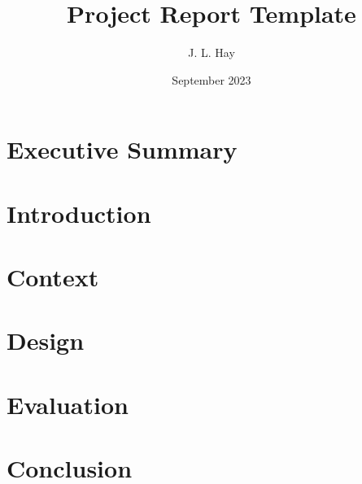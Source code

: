 \documentclass{article}
\title{Project Report Template}
\author{J. L. Hay \cite{hay22}}
\date{September 2023}
\begin{document}
\maketitle

\thispagestyle{empty}

\pagebreak



\section*{Executive Summary}


\pagebreak


\tableofcontents

\pagebreak


\fancyfoot[R]{\thepage/\pageref*{page:final}}

\section{Introduction}


\pagebreak


\section{Context}


\pagebreak


\section{Design}


\pagebreak


\section{Evaluation}


\pagebreak


\section*{Conclusion}
\label{page:final}


\pagebreak


\fancyfoot[R]{\thepage}

\printbibliography
{}

\pagebreak
\appendix


\end{document}
